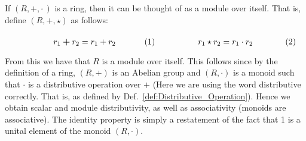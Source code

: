     \begin{example}
        If $(R,+,\cdot\,)$ is a ring, then it can be thought of as a module over
        itself. That is, define $(R,\boldsymbol{+},\star)$ as follows:
        \par\hfill\par
        \begin{subequations}
            \begin{minipage}[b]{0.49\textwidth}
                \begin{equation}
                    r_{1}\boldsymbol{+}r_{2}=r_{1}+r_{2}
                \end{equation}
            \end{minipage}
            \hfill
            \begin{minipage}[b]{0.49\textwidth}
                \begin{equation}
                    r_{1}\star{r}_{2}=r_{1}\cdot{r}_{2}
                \end{equation}
            \end{minipage}
        \end{subequations}
        \par\vspace{2.5ex}
        From this we have that $R$ is a module over itself. This follows since
        by the definition of a \gls{ring}, $(R,+)$ is an Abelian group and
        $(R,\cdot)$ is a \gls{monoid} such that $\cdot$ is a distributive
        operation over $+$ (Here we are using the word distributive correctly.
        That is, as defined by Def.~\ref{def:Distributive_Operation}). Hence we
        obtain scalar and module distributivity, as well as associativity
        (monoids are associative). The identity property is simply a restatement
        of the fact that 1 is a unital element of the monoid $(R,\cdot)$.
    \end{example}
